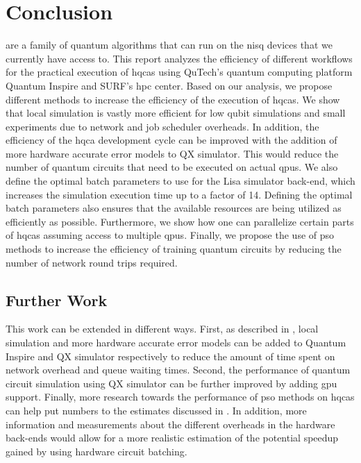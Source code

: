\chapter{Conclusion} \label{chap:conclusion}
 are a family of quantum algorithms that can run on the \gls{nisq} devices that we currently have access to.
This report analyzes the efficiency of different workflows for the practical execution of \glspl{hqca} using QuTech's quantum computing platform Quantum Inspire and SURF's \gls{hpc} center.
Based on our analysis, we propose different methods to increase the efficiency of the execution of \glspl{hqca}.
We show that local simulation is vastly more efficient for low qubit simulations and small experiments due to network and job scheduler overheads.
In addition, the efficiency of the \gls{hqca} development cycle can be improved with the addition of more hardware accurate error models to QX simulator.
This would reduce the number of quantum circuits that need to be executed on actual \glspl{qpu}.
We also define the optimal batch parameters to use for the Lisa simulator back-end, which increases the simulation execution time up to a factor of 14.
Defining the optimal batch parameters also ensures that the available resources are being utilized as efficiently as possible.
Furthermore, we show how one can parallelize certain parts of \glspl{hqca} assuming access to multiple \glspl{qpu}.
Finally, we propose the use of \gls{pso} methods to increase the efficiency of training quantum circuits by reducing the number of network round trips required.

\section*{Further Work}
This work can be extended in different ways.
First, as described in , local simulation and more hardware accurate error models can be added to Quantum Inspire and QX simulator respectively to reduce the amount of time spent on network overhead and queue waiting times.
Second, the performance of quantum circuit simulation using QX simulator can be further improved by adding \gls{gpu} support.
Finally, more research towards the performance of \gls{pso} methods on \glspl{hqca} can help put numbers to the estimates discussed in .
In addition, more information and measurements about the different overheads in the hardware back-ends would allow for a more realistic estimation of the potential speedup gained by using hardware circuit batching.